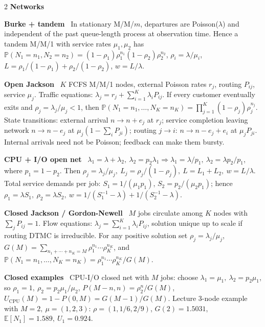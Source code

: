 \documentclass[10pt,fleqn]{article}
\newcommand{\PP}{\mathbb{P}}
\newcommand{\E}{\mathbb{E}}
\newcommand{\shead}[1]{\vspace{0.05ex}\textbf{\scriptsize #1}\par}
\newcommand{\topic}[1]{\textbf{#1}\ }
\begin{document}
\begin{multicols*}{2}
\shead{Networks}
\topic{Burke + tandem} In stationary M/M/\(m\), departures are Poisson(\(\lambda\)) and independent of the past queue-length process at observation time. Hence a tandem M/M/1 with service rates \(\mu_1,\mu_2\) has \(\PP(N_1=n_1,N_2=n_2)=(1-\rho_1)\rho_1^{n_1}(1-\rho_2)\rho_2^{n_2}\), \(\rho_i=\lambda/\mu_i\), \(L=\rho_1/(1-\rho_1)+\rho_2/(1-\rho_2)\), \(w=L/\lambda\).

\topic{Open Jackson} \(K\) FCFS M/M/1 nodes, external Poisson rates \(r_j\), routing \(P_{ij}\), service \(\mu_j\). Traffic equations: \(\lambda_j=r_j+\sum_{i=1}^K\lambda_iP_{ij}\). If every customer eventually exits and \(\rho_j=\lambda_j/\mu_j<1\), then \(\PP(N_1=n_1,\dots,N_K=n_K)=\prod_{j=1}^K(1-\rho_j)\rho_j^{n_j}\). State transitions: external arrival \(n\to n+e_j\) at \(r_j\); service completion leaving network \(n\to n-e_j\) at \(\mu_j(1-\sum_iP_{ji})\); routing \(j\to i\): \(n\to n-e_j+e_i\) at \(\mu_jP_{ji}\). Internal arrivals need not be Poisson; feedback can make them bursty.

\topic{CPU + I/O open net} \(\lambda_1=\lambda+\lambda_2,\ \lambda_2=p_2\lambda_1\Rightarrow \lambda_1=\lambda/p_1,\ \lambda_2=\lambda p_2/p_1\), where \(p_1=1-p_2\). Then \(\rho_j=\lambda_j/\mu_j,\ L_j=\rho_j/(1-\rho_j),\ L=L_1+L_2,\ w=L/\lambda\). Total service demands per job: \(S_1=1/(\mu_1p_1)\), \(S_2=p_2/(\mu_2p_1)\); hence \(\rho_1=\lambda S_1,\ \rho_2=\lambda S_2,\ w=1/(S_1^{-1}-\lambda)+1/(S_2^{-1}-\lambda)\).

\topic{Closed Jackson / Gordon-Newell} \(M\) jobs circulate among \(K\) nodes with \(\sum_jP_{ij}=1\). Flow equations: \(\lambda_j=\sum_{i=1}^K\lambda_iP_{ij}\), solution unique up to scale if routing DTMC is irreducible. For any positive solution set \(\rho_j=\lambda_j/\mu_j\), \(G(M)=\sum_{n_1+\cdots+n_K=M}\rho_1^{n_1}\cdots\rho_K^{n_K}\), and \(\PP(N_1=n_1,\dots,N_K=n_K)=\rho_1^{n_1}\cdots\rho_K^{n_K}/G(M)\).

\topic{Closed examples} CPU-I/O closed net with \(M\) jobs: choose \(\lambda_1=\mu_1,\ \lambda_2=p_2\mu_1\), so \(\rho_1=1,\ \rho_2=p_2\mu_1/\mu_2\), \(P(M-n,n)=\rho_2^n/G(M)\), \(U_{\text{CPU}}(M)=1-P(0,M)=G(M-1)/G(M)\). Lecture 3-node example with \(M=2,\ \mu=(1,2,3)\): \(\rho=(1,1/6,2/9)\), \(G(2)=1.5031\), \(\E[N_1]=1.589,\ U_1=0.924\).


\end{multicols*}
\end{document}
